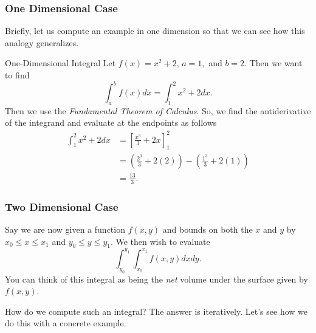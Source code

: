              	
             	        
             	        \subsubsection{One Dimensional Case}
             	        Briefly, let us compute an example in one dimension so that we can see how this analogy generalizes.
             	        
             	        \begin{ex}{One-Dimensional Integral}
             	        Let $f(x) = x^2+2$, $a=1,$ and $b=2$. Then we want to find
             	        \[
             	        \int_a^b f(x)dx = \int_1^2 x^2+2dx.
             	        \]
             	        Then we use the \emph{Fundamental Theorem of Calculus}. So, we find the antiderivative of the integrand and evaluate at the endpoints as follows
             	        \begin{align*}
             	            \int_1^2 x^2+2dx &= \left[ \frac{x^3}{3}+2x\right]_1^2\\
             	            &= \left(\frac{2^3}{3}+2(2)\right) - \left( \frac{1^3}{3}+2(1)\right)\\
             	            &= \frac{13}{3}.
             	        \end{align*}
             	        \end{ex}
             	        
             	        \subsubsection{Two Dimensional Case}
             	        
             	        Say we are now given a function $f(x,y)$ and bounds on both the $x$ and $y$ by
             	        $x_0 \leq x \leq x_1$ and $y_0 \leq y \leq y_1$.  We then wish to evaluate
             	        \[
             	        \int_{y_0}^{y_1} \int_{x_0}^{x_1} f(x,y)dxdy.
             	        \]
             	        You can think of this integral as being the \emph{net} volume under the surface given by $f(x,y)$.  
             	        
             	        How do we compute such an integral? The answer is iteratively.  Let's see how we do this with a concrete example.
             	        
